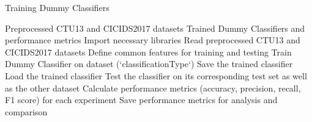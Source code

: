 \begin{algorithm}[ht]
    \caption{Training Dummy Classifiers}\label{alg:trainDummyClassifier}
    \begin{algorithmic}[1]
    \Require%
    Preprocessed CTU13 and CICIDS2017 datasets
    \Ensure%
    Trained Dummy Classifiers and performance metrics
    \State%
    Import necessary libraries
    \State%
    Read preprocessed CTU13 and CICIDS2017 datasets
    \State%
    Define common features for training and testing
        \State%
        Train Dummy Classifier on dataset (`classificationType`)
        \State%
        Save the trained classifier
    \EndFunction%
        \State%
        Load the trained classifier
        \State%
        Test the classifier on its corresponding test set as well as the other dataset
        \State%
        Calculate performance metrics (accuracy, precision, recall, F1 score) for each experiment
        \State%
        Save performance metrics for analysis and comparison
    \EndFunction%
            \State%
            \State%
            \State%
        \EndIf%
    \EndFor%
        \State%
    \EndFor%
    \end{algorithmic}
\end{algorithm}

